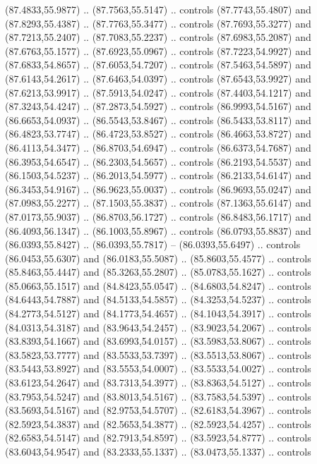 \begin{scope}[cm={{1.25,0.0,0.0,-1.25,(-71.74049,81.13304)}}]
        (87.4833,55.9877) .. (87.7563,55.5147) .. controls (87.7743,55.4807) and
        (87.8293,55.4387) .. (87.7763,55.3477) .. controls (87.7693,55.3277) and
        (87.7213,55.2407) .. (87.7083,55.2237) .. controls (87.6983,55.2087) and
        (87.6763,55.1577) .. (87.6923,55.0967) .. controls (87.7223,54.9927) and
        (87.6833,54.8657) .. (87.6053,54.7207) .. controls (87.5463,54.5897) and
        (87.6143,54.2617) .. (87.6463,54.0397) .. controls (87.6543,53.9927) and
        (87.6213,53.9917) .. (87.5913,54.0247) .. controls (87.4403,54.1217) and
        (87.3243,54.4247) .. (87.2873,54.5927) .. controls (86.9993,54.5167) and
        (86.6653,54.0937) .. (86.5543,53.8467) .. controls (86.5433,53.8117) and
        (86.4823,53.7747) .. (86.4723,53.8527) .. controls (86.4663,53.8727) and
        (86.4113,54.3477) .. (86.8703,54.6947) .. controls (86.6373,54.7687) and
        (86.3953,54.6547) .. (86.2303,54.5657) .. controls (86.2193,54.5537) and
        (86.1503,54.5237) .. (86.2013,54.5977) .. controls (86.2133,54.6147) and
        (86.3453,54.9167) .. (86.9623,55.0037) .. controls (86.9693,55.0247) and
        (87.0983,55.2277) .. (87.1503,55.3837) .. controls (87.1363,55.6147) and
        (87.0173,55.9037) .. (86.8703,56.1727) .. controls (86.8483,56.1717) and
        (86.4093,56.1347) .. (86.1003,55.8967) .. controls (86.0793,55.8837) and
        (86.0393,55.8427) .. (86.0393,55.7817) -- (86.0393,55.6497) .. controls
        (86.0453,55.6307) and (86.0183,55.5087) .. (85.8603,55.4577) .. controls
        (85.8463,55.4447) and (85.3263,55.2807) .. (85.0783,55.1627) .. controls
        (85.0663,55.1517) and (84.8423,55.0547) .. (84.6803,54.8247) .. controls
        (84.6443,54.7887) and (84.5133,54.5857) .. (84.3253,54.5237) .. controls
        (84.2773,54.5127) and (84.1773,54.4657) .. (84.1043,54.3917) .. controls
        (84.0313,54.3187) and (83.9643,54.2457) .. (83.9023,54.2067) .. controls
        (83.8393,54.1667) and (83.6993,54.0157) .. (83.5983,53.8067) .. controls
        (83.5823,53.7777) and (83.5533,53.7397) .. (83.5513,53.8067) .. controls
        (83.5443,53.8927) and (83.5553,54.0007) .. (83.5533,54.0027) .. controls
        (83.6123,54.2647) and (83.7313,54.3977) .. (83.8363,54.5127) .. controls
        (83.7953,54.5247) and (83.8013,54.5167) .. (83.7583,54.5397) .. controls
        (83.5693,54.5167) and (82.9753,54.5707) .. (82.6183,54.3967) .. controls
        (82.5923,54.3837) and (82.5653,54.3877) .. (82.5923,54.4257) .. controls
        (82.6583,54.5147) and (82.7913,54.8597) .. (83.5923,54.8777) .. controls
        (83.6043,54.9547) and (83.2333,55.1337) .. (83.0473,55.1337) .. controls

\end{scope}
